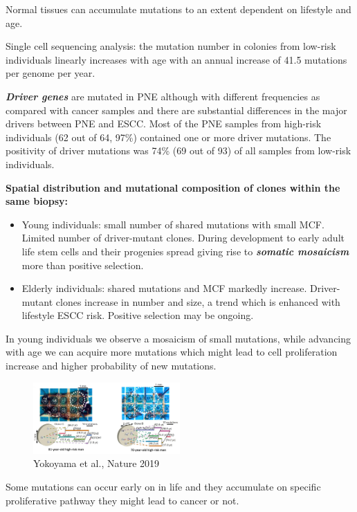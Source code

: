 Normal tissues can accumulate mutations to an extent dependent on lifestyle and age.

Single cell sequencing analysis: the mutation number in colonies from low-risk individuals linearly increases with age with an annual increase of 41.5 mutations per genome per year.

\textbf{\emph{Driver genes}} are mutated in PNE although with different frequencies as compared with
cancer samples and there are substantial differences in the major drivers between PNE and ESCC. Most of the PNE samples from high-risk individuals (62 out of 64, 97\%) contained one or more driver mutations. The positivity of driver mutations was 74\% (69 out of 93) of all samples from low-risk individuals.

\textbf{Spatial distribution and mutational composition of clones within the same biopsy:}

\begin{itemize}
\tightlist
\item
  Young individuals: small number of shared mutations with small MCF. Limited number of driver-mutant clones. During development to early adult life stem cells and their progenies spread giving rise to \textbf{\emph{somatic mosaicism}} more than positive selection.
\item
  Elderly individuals: shared mutations and MCF markedly increase. Driver-mutant clones increase in number and size, a trend which is enhanced with lifestyle ESCC risk. Positive selection may be ongoing.
\end{itemize}

In young individuals we observe a mosaicism of small mutations, while advancing with age we can acquire more mutations which might lead to cell proliferation increase and higher probability of new mutations.

\begin{figure}
\centering
\includegraphics[width=0.5\textwidth]{../_resources/Screen_Shot_2022-11-04_at_10-59-51.png}
\caption{Yokoyama et al., Nature 2019}
\end{figure}


Some mutations can occur early on in life and they accumulate on specific proliferative pathway they might lead to cancer or not.

